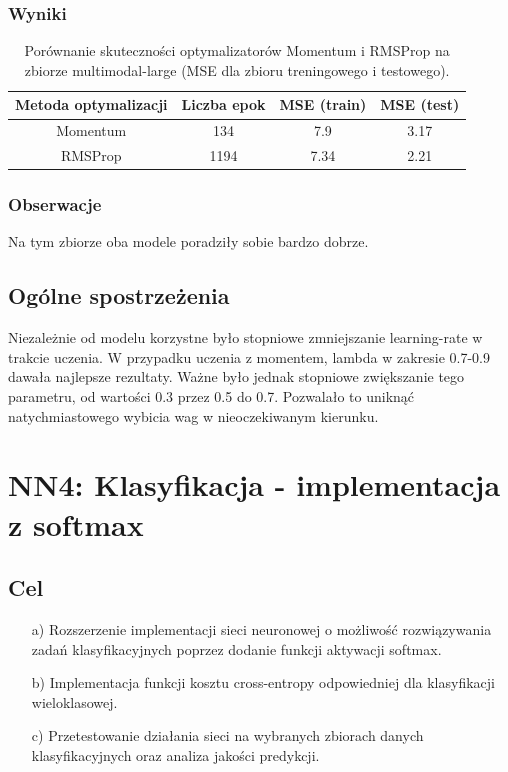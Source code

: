 \documentclass{article}
\begin{document}
\subsubsection*{Wyniki}
\begin{table}[H]
    \centering
    \begin{tabular}{|c|c|c|c|}
        \hline
        Metoda optymalizacji & Liczba epok & MSE (train) & MSE (test) \\
        \hline
        Momentum & 134 & 7.9 & 3.17 \\
        RMSProp & 1194 & 7.34 & 2.21 \\
        \hline
    \end{tabular}
    \caption{Porównanie skuteczności optymalizatorów Momentum i RMSProp na zbiorze multimodal-large (MSE dla zbioru treningowego i testowego).}
\end{table}

\subsubsection*{Obserwacje}
Na tym zbiorze oba modele poradziły sobie bardzo dobrze.

\subsection*{Ogólne spostrzeżenia}
Niezależnie od modelu korzystne było stopniowe zmniejszanie learning-rate w trakcie uczenia. W przypadku uczenia z momentem, lambda w zakresie 0.7-0.9 dawała najlepsze rezultaty. Ważne było jednak stopniowe zwiększanie tego parametru, od wartości 0.3 przez 0.5 do 0.7. Pozwalało to uniknąć natychmiastowego wybicia wag w nieoczekiwanym kierunku.


\section*{NN4: Klasyfikacja - implementacja z softmax}
\subsection*{Cel}
\begin{enumerate}
    \item[a)] Rozszerzenie implementacji sieci neuronowej o możliwość rozwiązywania zadań klasyfikacyjnych poprzez dodanie funkcji aktywacji softmax.
    \item[b)] Implementacja funkcji kosztu cross-entropy odpowiedniej dla klasyfikacji wieloklasowej.
    \item[c)] Przetestowanie działania sieci na wybranych zbiorach danych klasyfikacyjnych oraz analiza jakości predykcji.
\end{enumerate}
\end{document}

